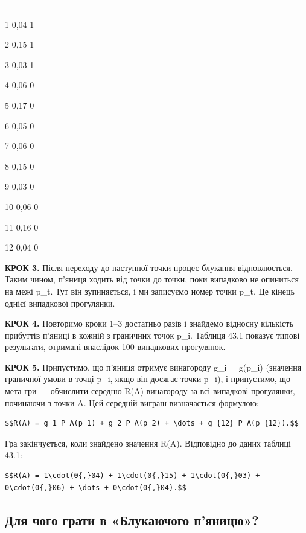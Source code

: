 \documentclass[
  ukrainian,
]{article}
\begin{document}
\textbar---\textbar---\textbar---\textbar{}

1 \textbar{} 0,04 \textbar{} 1 \textbar{}

2 \textbar{} 0,15 \textbar{} 1 \textbar{}

3 \textbar{} 0,03 \textbar{} 1 \textbar{}

4 \textbar{} 0,06 \textbar{} 0 \textbar{}

5 \textbar{} 0,17 \textbar{} 0 \textbar{}

6 \textbar{} 0,05 \textbar{} 0 \textbar{}

7 \textbar{} 0,06 \textbar{} 0 \textbar{}

8 \textbar{} 0,15 \textbar{} 0 \textbar{}

9 \textbar{} 0,03 \textbar{} 0 \textbar{}

10 \textbar{} 0,06 \textbar{} 0 \textbar{}

11 \textbar{} 0,16 \textbar{} 0 \textbar{}

12 \textbar{} 0,04 \textbar{} 0 \textbar{}

\textbf{КРОК 3.} Після переходу до наступної точки процес блукання
відновлюється. Таким чином, п'яниця ходить від точки до точки, поки
випадково не опиниться на межі p\_t. Тут він зупиняється, і ми записуємо
номер точки p\_t. Це кінець однієї випадкової прогулянки.

\textbf{КРОК 4.} Повторимо кроки 1--3 достатньо разів і знайдемо
відносну кількість прибуттів п'яниці в кожній з граничних точок p\_i.
Таблиця 43.1 показує типові результати, отримані внаслідок 100
випадкових прогулянок.

\textbf{КРОК 5.} Припустимо, що п'яниця отримує винагороду g\_i =
g(p\_i) (значення граничної умови в точці p\_i, якщо він досягає точки
p\_i), і припустимо, що мета гри --- обчислити середню R(A) винагороду
за всі випадкові прогулянки, починаючи з точки A. Цей середній виграш
визначається формулою:

\begin{verbatim}
$$R(A) = g_1 P_A(p_1) + g_2 P_A(p_2) + \dots + g_{12} P_A(p_{12}).$$
\end{verbatim}

Гра закінчується, коли знайдено значення R(A). Відповідно до даних
таблиці 43.1:

\begin{verbatim}
$$R(A) = 1\cdot(0{,}04) + 1\cdot(0{,}15) + 1\cdot(0{,}03) + 0\cdot(0{,}06) + \dots + 0\cdot(0{,}04).$$
\end{verbatim}

\subsection{Для чого грати в «Блукаючого
п'яницю»?}\label{ux434ux43bux44f-ux447ux43eux433ux43e-ux433ux440ux430ux442ux438-ux432-ux431ux43bux443ux43aux430ux44eux447ux43eux433ux43e-ux43fux44fux43dux438ux446ux44e}
\end{document}
